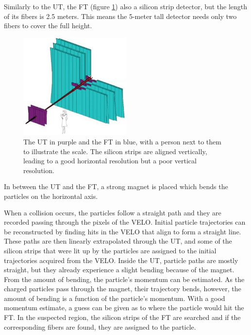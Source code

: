 \documentclass[12pt]{article}
\begin{document}
Similarly to the UT, the FT (figure \ref{fig_detector_ut_ft_drawing}) also a silicon strip detector, but the length of its fibers is 2.5 meters. This means the 5-meter tall detector needs only two fibers to cover the full height.

\begin{figure}[H]
	\begin{center}
		\includegraphics[width=0.5\textwidth]{detector_ut_ft_drawing}
	\end{center}
	\caption[The UT and FT detectors, schematic view]{The UT in purple and the FT in blue, with a person next to them to illustrate the scale. The silicon strips are aligned vertically, leading to a good horizontal resolution but a poor vertical resolution. \cite{tracker_image}}
	\label{fig_detector_ut_ft_drawing}
\end{figure}

In between the UT and the FT, a strong magnet is placed which bends the particles on the horizontal axis.

When a collision occurs, the particles follow a straight path and they are recorded passing through the pixels of the VELO. Initial particle trajectories can be reconstructed by finding hits in the VELO that align to form a straight line. These paths are then linearly extrapolated through the UT, and some of the silicon strips that were lit up by the particles are assigned to the initial trajectories acquired from the VELO. Inside the UT, particle paths are mostly straight, but they already experience a slight bending because of the magnet. From the amount of bending, the particle's momentum can be estimated. As the charged particles pass through the magnet, their trajectory bends, however, the amount of bending is a function of the particle's momentum. With a good momentum estimate, a guess can be given as to where the particle would hit the FT. In the suspected region, the silicon strips of the FT are searched and if the corresponding fibers are found, they are assigned to the particle.
\end{document}

